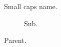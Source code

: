 \documentclass{article}
\begin{document}
\begin{figure}\caption{Small caps name.}\end{figure}
\begin{figure}\begin{subfigure}{.4\textwidth}\caption{Sub.}\end{subfigure}\caption{Parent.}\end{figure}
\end{document}
